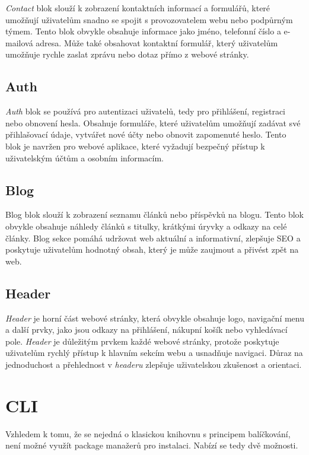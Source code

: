 \emph{Contact} blok slouží k zobrazení kontaktních informací a formulářů, které umožňují uživatelům snadno se spojit s provozovatelem webu nebo podpůrným týmem. Tento blok obvykle obsahuje informace jako jméno, telefonní číslo a e-mailová adresa. Může také obsahovat kontaktní formulář, který uživatelům umožňuje rychle zaslat zprávu nebo dotaz přímo z webové stránky.

\subsection{Auth}

\emph{Auth} blok se používá pro autentizaci uživatelů, tedy pro přihlášení, registraci nebo obnovení hesla. Obsahuje formuláře, které uživatelům umožňují zadávat své přihlašovací údaje, vytvářet nové účty nebo obnovit zapomenuté heslo. Tento blok je navržen pro webové aplikace, které vyžadují bezpečný přístup k uživatelským účtům a osobním informacím.

\subsection{Blog}

Blog blok slouží k zobrazení seznamu článků nebo příspěvků na blogu. Tento blok obvykle obsahuje náhledy článků s titulky, krátkými úryvky a odkazy na celé články. Blog sekce pomáhá udržovat web aktuální a informativní, zlepšuje SEO a poskytuje uživatelům hodnotný obsah, který je může zaujmout a přivést zpět na web.

\subsection{Header}

\emph{Header} je horní část webové stránky, která obvykle obsahuje logo, navigační menu a další prvky, jako jsou odkazy na přihlášení, nákupní košík nebo vyhledávací pole. \emph{Header} je důležitým prvkem každé webové stránky, protože poskytuje uživatelům rychlý přístup k hlavním sekcím webu a usnadňuje navigaci. Důraz na jednoduchost a přehlednost v \emph{headeru} zlepšuje uživatelskou zkušenost a orientaci.

\section{CLI}
Vzhledem k tomu, že se nejedná o klasickou knihovnu s principem balíčkování, není možné využít package manažerů pro instalaci. Nabízí se tedy dvě možnosti.

